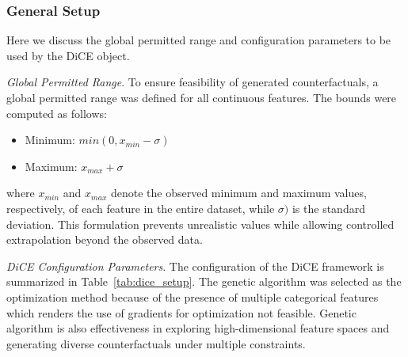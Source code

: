 \documentclass[pdflatex,sn-vancouver-num]{sn-jnl}
\begin{document}
\begin{table}[h!]
\caption{Actionability classification of input features for counterfactual explanation generation. Each feature was evaluated along three criteria: clinical modifiability, reversibility, and intervention feasibility. Features rated Suitable are both modifiable and clinically actionable (e.g., HbA1c via diet or medication; insulin use via prescription change). Features rated Conditional are partially manageable but not fully reversible (e.g., Chronic Kidney Disease through nephroprotective interventions; Peripheral Arterial Occlusive Disease through revascularization). Features rated Unsuitable are either immutable (sex, age, diabetes duration), too vague for targeted intervention (other symptoms), or reflective of examination or procedural measurements rather than modifiable patient states (neurological examination findings, MNSI score, Sudoscan readings). Only Suitable and Conditional features were included in counterfactual generation to ensure that all generated counterfactual scenarios correspond to clinically meaningful and potentially achievable patient states.}
\label{tab:cf_features}
\end{table}

\subsubsection{General Setup}
Here we discuss the global permitted range and configuration parameters to be used by the DiCE object.

\textit{Global Permitted Range}.
To ensure feasibility of generated counterfactuals, a global permitted range was defined for all continuous features. The bounds were computed as follows:
\begin{itemize}
    \itemsep0em 
    \item Minimum: $min(0,x_{min} - \sigma)$
    \item Maximum: $x_{max} + \sigma$
\end{itemize}
where $x_{min}$ and $x_{max}$ denote the observed minimum and maximum values, respectively, of each feature in the entire dataset, while $\sigma)$ is the standard deviation. This formulation prevents unrealistic values while allowing controlled extrapolation beyond the observed data.

\textit{DiCE Configuration Parameters}. The configuration of the DiCE framework is summarized in Table~\ref{tab:dice_setup}. The genetic algorithm was selected as the optimization method because of the presence of multiple categorical features which renders the use of gradients for optimization not feasible. Genetic algorithm is also effectiveness in exploring high-dimensional feature spaces and generating diverse counterfactuals under multiple constraints.
\end{document}
